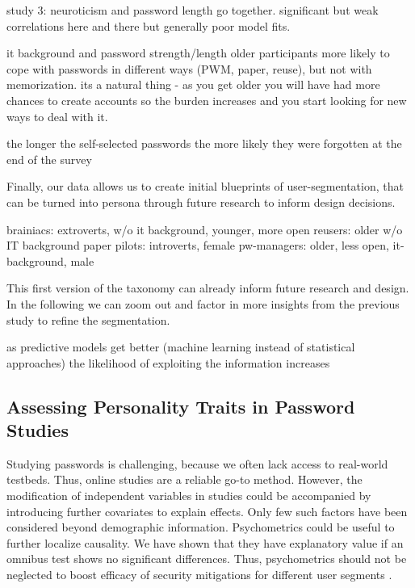 study 3:
neuroticism and password length go together. significant but weak correlations here and there but generally poor model fits. 

it background and password strength/length 
older participants more likely to cope with passwords in different ways (PWM, paper, reuse), but not with memorization. its a natural thing - as you get older you will have had more chances to create accounts so the burden increases and you start looking for new ways to deal with it. 

the longer the self-selected passwords the more likely they were forgotten at the end of the survey


Finally, our data allows us to create initial blueprints of user-segmentation, that can be turned into \gls{persona} through future research to inform design decisions.

brainiacs: extroverts,  w/o it background, younger, more open
reusers: older w/o IT background
paper pilots: introverts, female
pw-managers: older, less open, it-background, male

This first version of the taxonomy can already inform future research and design. In the following we can zoom out and factor in more insights from the previous study to refine the segmentation.


as predictive models get better (machine learning instead of statistical approaches) the likelihood of exploiting the information increases 


\subsection{Assessing Personality Traits in Password Studies}
Studying passwords is challenging, because we often lack access to real-world testbeds. Thus, online studies are a reliable go-to method. However, the modification of independent variables in studies could be accompanied by introducing further covariates to explain effects. Only few such factors have been considered beyond demographic information. Psychometrics could be useful to further localize causality. We have shown that they have explanatory value if an omnibus test shows no significant differences. Thus, psychometrics should not be neglected to boost efficacy of security mitigations for different user segments \cite{Egelman2015AverageUser}. 

